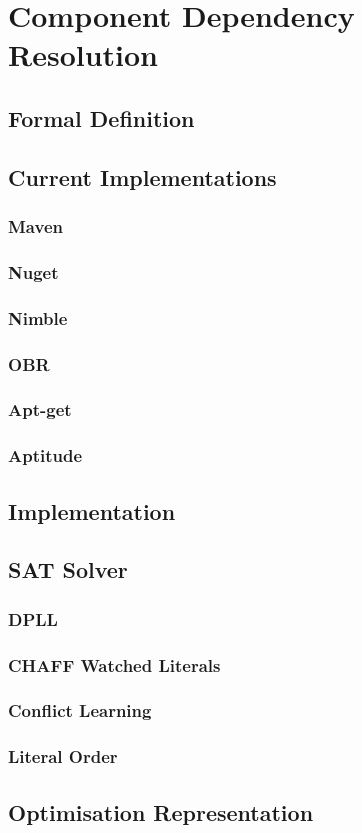 \chapter{Component Dependency Resolution}

\section{Formal Definition}


\section{Current Implementations}
\subsection{Maven}

\subsection{Nuget} 

\subsection{Nimble}
\subsection{OBR}
\subsection{Apt-get}
\subsection{Aptitude}


\section{Implementation}

\section{SAT Solver}
\subsection{DPLL}
\subsection{CHAFF Watched Literals}
\subsection{Conflict Learning}
\subsection{Literal Order}

\section{Optimisation Representation}

